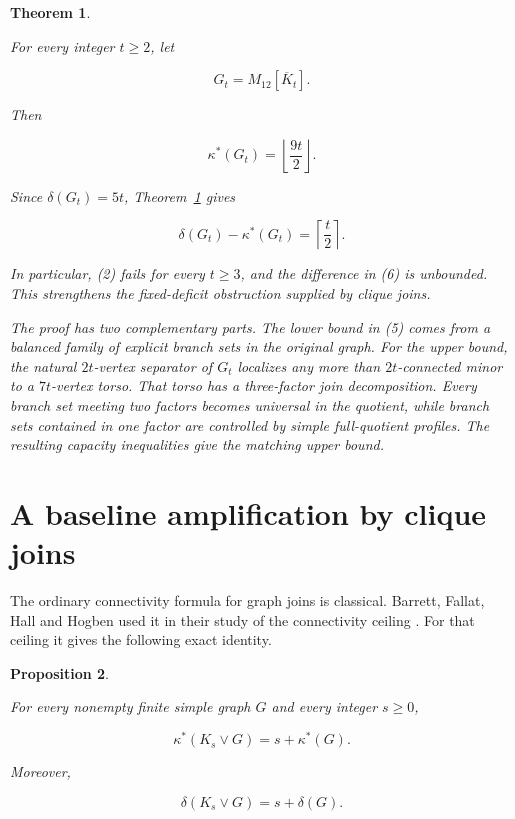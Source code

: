 \documentclass[11pt]{article}
\newtheorem{theorem}{Theorem}
\newtheorem{proposition}[theorem]{Proposition}
\begin{document}
\begin{theorem}
\label{thm:main}

For every integer $t\geq2$, let

\nopagebreak[4]
\[
G_t=M_{12}[\overline K_t].
\]

Then

\nopagebreak[4]
\[
\kappa^*(G_t)=\left\lfloor\frac{9t}{2}\right\rfloor.        \tag{5}
\]

Since $\delta(G_t)=5t$, Theorem~\ref{thm:main} gives

\nopagebreak[4]
\[
\delta(G_t)-\kappa^*(G_t)=\left\lceil\frac t2\right\rceil. \tag{6}
\]

In particular, (2) fails for every $t\geq3$, and the difference in (6) is
unbounded. This strengthens the fixed-deficit obstruction supplied by clique
joins.

The proof has two complementary parts. The lower bound in (5) comes from a
balanced family of explicit branch sets in the original graph. For the upper
bound, the natural $2t$-vertex separator of $G_t$ localizes any more than
$2t$-connected minor to a $7t$-vertex torso. That torso has a three-factor join
decomposition. Every branch set meeting two factors becomes universal in the
quotient, while branch sets contained in one factor are controlled by simple
full-quotient profiles. The resulting capacity inequalities give the matching upper
bound.

\end{theorem}

\section{A baseline amplification by clique joins}


The ordinary connectivity formula for graph joins is classical. Barrett,
Fallat, Hall and Hogben used it in their study of the connectivity ceiling \cite{barrett2013}.
For that ceiling it gives the following exact identity.

\begin{proposition}
\label{prop:join}

For every nonempty finite simple graph $G$ and every integer $s\geq0$,

\nopagebreak[4]
\[
\kappa^*(K_s\vee G)=s+\kappa^*(G).                          \tag{J1}
\]

Moreover,

\nopagebreak[4]
\[
\delta(K_s\vee G)=s+\delta(G).                              \tag{J2}
\]

\end{proposition}
\end{document}
